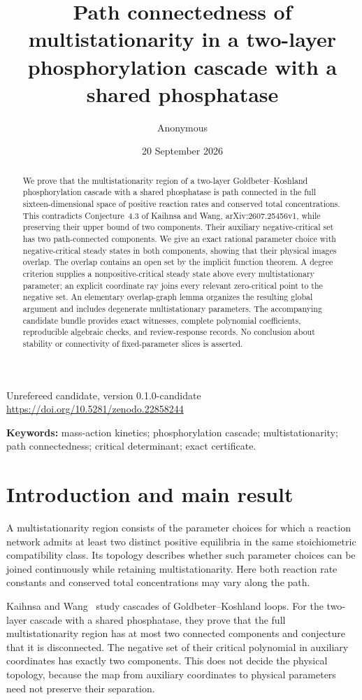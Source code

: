 \documentclass[11pt,a4paper]{article}
\title{Path connectedness of multistationarity in a two-layer phosphorylation cascade with a shared phosphatase}
\author{Anonymous}
\date{20 September 2026}
\numberwithin{equation}{section}
\theoremstyle{remark}\newtheorem{remark}[theorem]{Remark}
\begin{document}
\maketitle
\begin{center}\small Unrefereed candidate, version 0.1.0-candidate\\
\url{https://doi.org/10.5281/zenodo.22858244}
\end{center}
\begin{abstract}
We prove that the multistationarity region of a two-layer Goldbeter--Koshland phosphorylation cascade with a shared phosphatase is path connected in the full sixteen-dimensional space of positive reaction rates and conserved total concentrations. This contradicts Conjecture~4.3 of Kaihnsa and Wang, arXiv:2607.25456v1, while preserving their upper bound of two components. Their auxiliary negative-critical set has two path-connected components. We give an exact rational parameter choice with negative-critical steady states in both components, showing that their physical images overlap. The overlap contains an open set by the implicit function theorem. A degree criterion supplies a nonpositive-critical steady state above every multistationary parameter; an explicit coordinate ray joins every relevant zero-critical point to the negative set. An elementary overlap-graph lemma organizes the resulting global argument and includes degenerate multistationary parameters. The accompanying candidate bundle provides exact witnesses, complete polynomial coefficients, reproducible algebraic checks, and review-response records. No conclusion about stability or connectivity of fixed-parameter slices is asserted.
\end{abstract}
\noindent\textbf{Keywords:} mass-action kinetics; phosphorylation cascade; multistationarity; path connectedness; critical determinant; exact certificate.

\section{Introduction and main result}
A multistationarity region consists of the parameter choices for which a reaction network admits at least two distinct positive equilibria in the same stoichiometric compatibility class. Its topology describes whether such parameter choices can be joined continuously while retaining multistationarity. Here both reaction rate constants and conserved total concentrations may vary along the path.

Kaihnsa and Wang~\cite{KW} study cascades of Goldbeter--Koshland loops. For the two-layer cascade with a shared phosphatase, they prove that the full multistationarity region has at most two connected components and conjecture that it is disconnected. The negative set of their critical polynomial in auxiliary coordinates has exactly two components. This does not decide the physical topology, because the map from auxiliary coordinates to physical parameters need not preserve their separation.
\end{document}
